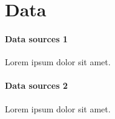\documentclass[paper.tex]{subfiles}
\begin{document}
\section{Data}\label{s:data}

\paragraph{Data sources 1} Lorem ipsum dolor sit amet.

\paragraph{Data sources 2} Lorem ipsum dolor sit amet.
\end{document}
